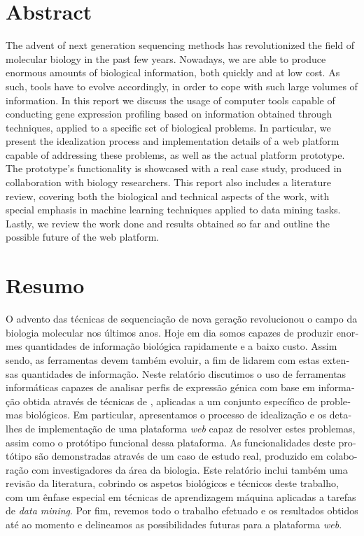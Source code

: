 \chapter*{Abstract}

The advent of next generation sequencing methods has revolutionized the field of
molecular biology in the past few years. Nowadays, we are able to produce
enormous amounts of biological information, both quickly and at low cost. As
such, tools have to evolve accordingly, in order to cope with such large volumes
of information. In this report we discuss the usage of computer tools capable of
conducting gene expression profiling based on information obtained through
\rnaseq{} techniques, applied to a specific set of biological problems. In
particular, we present the idealization process and implementation details of a
web platform capable of addressing these problems, as well as the actual
platform prototype. The prototype's functionality is showcased with a real case
study, produced in collaboration with biology researchers. This report also
includes a literature review, covering both the biological and technical aspects
of the work, with special emphasis in machine learning techniques applied to
data mining tasks. Lastly, we review the work done and results obtained so far
and outline the possible future of the web platform.

\chapter*{Resumo}

\begin{otherlanguage}{portuguese}
O advento das técnicas de sequenciação de nova geração revolucionou o campo da
biologia molecular nos últimos anos. Hoje em dia somos capazes de produzir
enormes quantidades de informação biológica rapidamente e a baixo custo. Assim
sendo, as ferramentas devem também evoluir, a fim de lidarem com estas extensas
quantidades de informação. Neste relatório discutimos o uso de ferramentas
informáticas capazes de analisar perfis de expressão génica com base em
informação obtida através de técnicas de \textit{\rnaseq{}}, aplicadas a um
conjunto específico de problemas biológicos. Em particular, apresentamos o
processo de idealização e os detalhes de implementação de uma plataforma
\textit{web} capaz de resolver estes problemas, assim como o protótipo funcional
dessa plataforma. As funcionalidades deste protótipo são demonstradas através de
um caso de estudo real, produzido em colaboração com investigadores da área da
biologia. Este relatório inclui também uma revisão da literatura, cobrindo os
aspetos biológicos e técnicos deste trabalho, com um ênfase especial em técnicas
de aprendizagem máquina aplicadas a tarefas de \textit{data mining}. Por fim,
revemos todo o trabalho efetuado e os resultados obtidos até ao momento e
delineamos as possibilidades futuras para a plataforma \textit{web}.
\end{otherlanguage}
